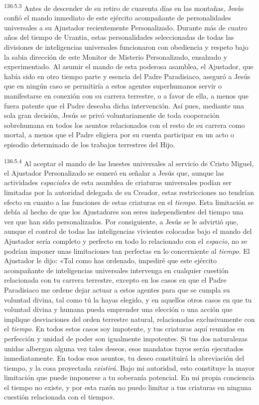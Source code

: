 \par
\textsuperscript{136:5.3} Antes de descender de su retiro de cuarenta días en las montañas, Jesús confió el mando inmediato de este ejército acompañante de personalidades universales a su Ajustador recientemente Personalizado. Durante más de cuatro años del tiempo de Urantia, estas personalidades seleccionadas de todas las divisiones de inteligencias universales funcionaron con obediencia y respeto bajo la sabia dirección de este Monitor de Misterio Personalizado, ensalzado y experimentado. Al asumir el mando de esta poderosa asamblea, el Ajustador, que había sido en otro tiempo parte y esencia del Padre Paradisiaco, aseguró a Jesús que en ningún caso se permitiría a estos agentes superhumanos servir o manifestarse en conexión con su carrera terrestre, o a favor de ella, a menos que fuera patente que el Padre deseaba dicha intervención. Así pues, mediante una sola gran decisión, Jesús se privó voluntariamente de toda cooperación sobrehumana en todos los asuntos relacionados con el resto de su carrera como mortal, a menos que el Padre eligiera por su cuenta participar en un acto o episodio determinado de los trabajos terrestres del Hijo.

\par
\textsuperscript{136:5.4} Al aceptar el mando de las huestes universales al servicio de Cristo Miguel, el Ajustador Personalizado se esmeró en señalar a Jesús que, aunque las actividades \textit{espaciales} de esta asamblea de criaturas universales podían ser limitadas por la autoridad delegada de su Creador, estas restricciones no tendrían efecto en cuanto a las funciones de estas criaturas en el \textit{tiempo}. Esta limitación se debía al hecho de que los Ajustadores son seres independientes del tiempo una vez que han sido personalizados. Por consiguiente, a Jesús se le advirtió que, aunque el control de todas las inteligencias vivientes colocadas bajo el mando del Ajustador sería completo y perfecto en todo lo relacionado con el \textit{espacio}, no se podrían imponer unas limitaciones tan perfectas en lo concerniente al \textit{tiempo}. El Ajustador le dijo: «Tal como has ordenado, impediré que este ejército acompañante de inteligencias universales intervenga en cualquier cuestión relacionada con tu carrera terrestre, excepto en los casos en que el Padre Paradisiaco me ordene dejar actuar a estos agentes para que se cumpla su voluntad divina, tal como tú la hayas elegido, y en aquellos otros casos en que tu voluntad divina y humana pueda emprender una elección o una acción que implique desviaciones del orden terrestre natural, relacionadas exclusivamente con el \textit{tiempo}. En todos estos casos soy impotente, y tus criaturas aquí reunidas en perfección y unidad de poder son igualmente impotentes. Si tus dos naturalezas unidas albergan alguna vez tales deseos, esos mandatos tuyos serán ejecutados inmediatamente. En todos esos asuntos, tu deseo constituirá la abreviación del tiempo, y la cosa proyectada \textit{existirá}. Bajo mi autoridad, esto constituye la mayor limitación que puede imponerse a tu soberanía potencial. En mi propia conciencia el tiempo no existe, y por esta razón no puedo limitar a tus criaturas en ninguna cuestión relacionada con el tiempo».

